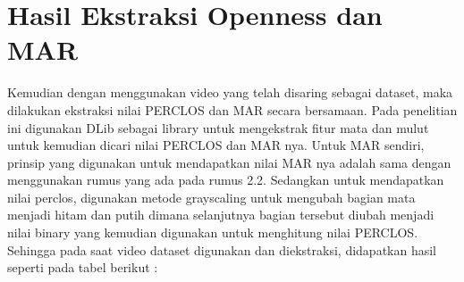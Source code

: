 \section{Hasil Ekstraksi Openness dan MAR}
\label{sec:skenariopengujian}
Kemudian dengan menggunakan video yang telah disaring sebagai dataset, maka dilakukan ekstraksi nilai PERCLOS dan MAR secara bersamaan. Pada penelitian ini digunakan DLib sebagai library untuk mengekstrak fitur mata dan mulut untuk kemudian dicari nilai PERCLOS dan MAR nya. Untuk MAR sendiri, prinsip yang digunakan untuk mendapatkan nilai MAR nya adalah sama dengan menggunakan rumus yang ada pada rumus 2.2. Sedangkan untuk mendapatkan nilai perclos, digunakan metode grayscaling untuk mengubah bagian mata menjadi hitam dan putih dimana selanjutnya bagian tersebut diubah menjadi nilai binary yang kemudian digunakan untuk menghitung nilai PERCLOS. Sehingga pada saat video dataset digunakan dan diekstraksi, didapatkan hasil seperti pada tabel berikut :

